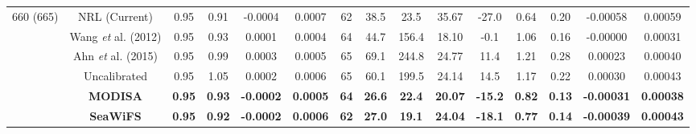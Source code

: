 \documentclass[preview]{standalone}
\begin{document}
\begin{tabular}{ccccccccccccccc}
\multirow{5}{*}{660 (665)} 	& NRL (Current) 			& 0.95 & 0.91 & -0.0004 & 0.0007 & 62 & 38.5 & 23.5 & 35.67 & -27.0 & 0.64 & 0.20 & -0.00058 & 0.00059 \\
							& Wang {\it et} al. (2012) 	& 0.95 & 0.93 & 0.0001 & 0.0004 & 64 & 44.7 & 156.4 & 18.10 & -0.1 & 1.06 & 0.16 & -0.00000 & 0.00031 \\
							& Ahn {\it et} al. (2015) 	& 0.95 & 0.99 & 0.0003 & 0.0005 & 65 & 69.1 & 244.8 & 24.77 & 11.4 & 1.21 & 0.28 & 0.00023 & 0.00040 \\
							& Uncalibrated 				& 0.95 & 1.05 & 0.0002 & 0.0006 & 65 & 60.1 & 199.5 & 24.14 & 14.5 & 1.17 & 0.22 & 0.00030 & 0.00043 \\
							& {\bf MODISA} 				& {\bf 0.95} & {\bf 0.93} & {\bf -0.0002} & {\bf 0.0005} & {\bf 64} & {\bf 26.6} & {\bf 22.4} & {\bf 20.07} & {\bf -15.2} & {\bf 0.82} & {\bf 0.13} & {\bf -0.00031} & {\bf 0.00038} \\
							& {\bf SeaWiFS} 			& {\bf 0.95} & {\bf 0.92} & {\bf -0.0002} & {\bf 0.0006} & {\bf 62} & {\bf 27.0} & {\bf 19.1} & {\bf 24.04} & {\bf -18.1} & {\bf 0.77} & {\bf 0.14} & {\bf -0.00039} & {\bf 0.00043} \\ \hline


\end{tabular}
\end{document}
